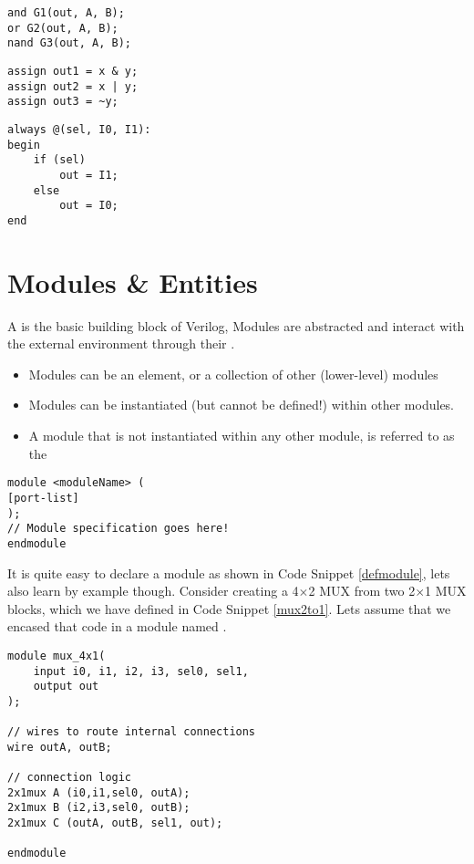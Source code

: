 \begin{lstlisting}[caption={Gate-Level Modeling}]
and G1(out, A, B);
or G2(out, A, B);
nand G3(out, A, B);
\end{lstlisting}

\begin{lstlisting}[caption={RTL Modeling}]
assign out1 = x & y;
assign out2 = x | y;
assign out3 = ~y;
\end{lstlisting}

\begin{lstlisting}[caption={Behavioral Modeling}, label={mux2to1}]
always @(sel, I0, I1):
begin
	if (sel)
		out = I1;
	else
		out = I0;
end
\end{lstlisting}

\section{Modules \& Entities}

A  is the basic building block of Verilog, Modules are abstracted and interact with the external environment through their .
\begin{itemize}
	\item Modules can be an element, or a collection of other (lower-level) modules
	\item Modules can be instantiated (but cannot be defined!) within other modules.
	\item A module that is not instantiated within any other module, is referred to as the 
\end{itemize}

\begin{marginfigure}
\begin{lstlisting}[caption={Module Declaration Syntax}, label={defmodule}]
module <moduleName> (
[port-list]
);
// Module specification goes here!
endmodule
\end{lstlisting}
\end{marginfigure}

It is quite easy to declare a module as shown in Code Snippet \ref{defmodule}, lets also learn by example though. Consider creating a 4$\times$2 MUX from two 2$\times$1 MUX blocks, which we have defined in Code Snippet \ref{mux2to1}. Lets assume that we encased that code in a module named .

\begin{minipage}{\linewidth}
\begin{lstlisting}[caption={Creating a 4x2 MUX from two 2x1 MUX modules}, label={mux4to2}]
module mux_4x1(
	input i0, i1, i2, i3, sel0, sel1,
	output out
);

// wires to route internal connections
wire outA, outB;

// connection logic
2x1mux A (i0,i1,sel0, outA);
2x1mux B (i2,i3,sel0, outB);
2x1mux C (outA, outB, sel1, out);

endmodule
\end{lstlisting}
\end{minipage}